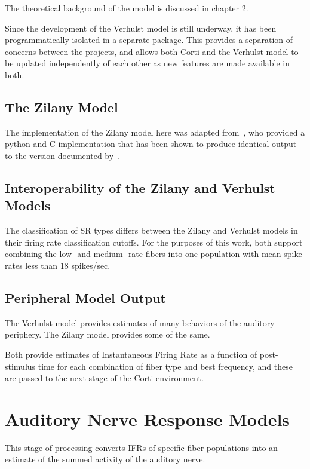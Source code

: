 The theoretical background of the model is discussed in chapter 2.

Since the development of the Verhulst model is still underway, it has been programmatically isolated in a separate package.  This provides a separation of concerns between the projects, and allows both Corti and the Verhulst model to be updated independently of each other as new features are made available in both.
\subsection{The Zilany Model} %
\label{sub:the_zilany_model}
The implementation of the Zilany model here was adapted from~\cite{Rudnicki2014Cochlea}, who provided a python and C implementation that has been shown to produce identical output to the version documented by~\cite{Zilany2014Updated}. 

\subsection{Interoperability of the Zilany and Verhulst Models} %
\label{sub:interoperability_of_the_zilany_and_verhulst_models}
The classification of SR types differs between the Zilany and Verhulst models in their firing rate classification cutoffs.  For the purposes of this work, both support combining the low- and medium- rate fibers into one population with mean spike rates less than 18 spikes/sec.  



\subsection{Peripheral Model Output} %
\label{sub:peripheral_model_output}
The Verhulst model provides estimates of many behaviors of the auditory periphery.  The Zilany model provides some of the same. 

Both provide estimates of Instantaneous Firing Rate as a function of post-stimulus time for each combination of fiber type and best frequency, and these are passed to the next stage of the Corti environment.


\section{Auditory Nerve Response Models} %
\label{sec:auditory_nerve_response_models}
This stage of processing converts IFRs of specific fiber populations into an estimate of the summed activity of the auditory nerve. 

